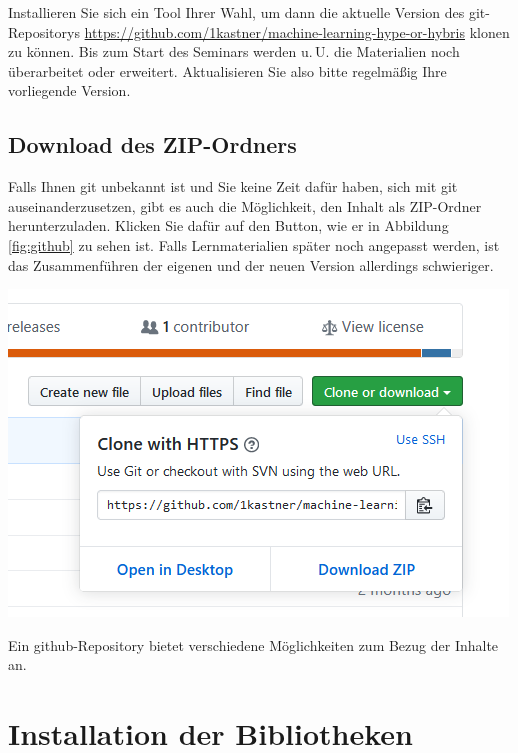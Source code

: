\documentclass{tufte-handout}
\begin{document}
Installieren Sie sich ein Tool Ihrer Wahl, um dann die aktuelle Version des git-Repositorys \url{https://github.com/1kastner/machine-learning-hype-or-hybris} klonen zu können.
Bis zum Start des Seminars werden u.\,U. die Materialien noch überarbeitet oder erweitert.
Aktualisieren Sie also bitte regelmäßig Ihre vorliegende Version.

\subsection{Download des ZIP-Ordners}

Falls Ihnen git unbekannt ist und Sie keine Zeit dafür haben, sich mit git auseinanderzusetzen, gibt es auch die Möglichkeit, den Inhalt als ZIP-Ordner herunterzuladen.
Klicken Sie dafür auf den Button, wie er in Abbildung\,\ref{fig:github} zu sehen ist.
Falls Lernmaterialien später noch angepasst werden, ist das Zusammenführen der eigenen und der neuen Version allerdings schwieriger.

\begin{marginfigure}
  \includegraphics{github-zip}
  \caption{Ein github-Repository bietet verschiedene Möglichkeiten zum Bezug der Inhalte an.}%
\label{fig:github}
\end{marginfigure}




\section{Installation der Bibliotheken}
\end{document}
